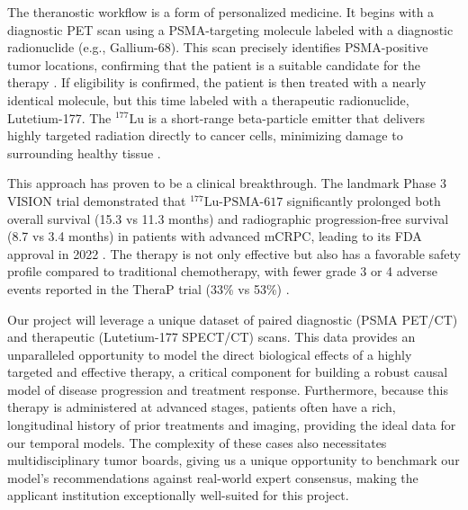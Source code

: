 \documentclass[11pt, a4paper]{article}
\begin{document}
The theranostic workflow is a form of personalized medicine. It begins with a diagnostic PET scan using a PSMA-targeting molecule labeled with a diagnostic radionuclide (e.g., Gallium-68). This scan precisely identifies PSMA-positive tumor locations, confirming that the patient is a suitable candidate for the therapy \cite{HennrichEder2022, KaewputVinjamuri2022}. If eligibility is confirmed, the patient is then treated with a nearly identical molecule, but this time labeled with a therapeutic radionuclide, Lutetium-177. The ${}^{177}\text{Lu}$ is a short-range beta-particle emitter that delivers highly targeted radiation directly to cancer cells, minimizing damage to surrounding healthy tissue \cite{HennrichEder2022, SadaghianiSheikhbahaei2022}.

This approach has proven to be a clinical breakthrough. The landmark Phase 3 VISION trial demonstrated that ${}^{177}\text{Lu-PSMA-617}$ significantly prolonged both overall survival (15.3 vs 11.3 months) and radiographic progression-free survival (8.7 vs 3.4 months) in patients with advanced mCRPC, leading to its FDA approval in 2022 \cite{TschanBorgna2022, ChandranFigg2022, RamnaraignSartor2023, JangKendi2023}. The therapy is not only effective but also has a favorable safety profile compared to traditional chemotherapy, with fewer grade 3 or 4 adverse events reported in the TheraP trial (33\% vs 53\%) \cite{HofmanEmmett2024, PatellKurian2023}.

Our project will leverage a unique dataset of paired diagnostic (PSMA PET/CT) and therapeutic (Lutetium-177 SPECT/CT) scans. This data provides an unparalleled opportunity to model the direct biological effects of a highly targeted and effective therapy, a critical component for building a robust causal model of disease progression and treatment response. Furthermore, because this therapy is administered at advanced stages, patients often have a rich, longitudinal history of prior treatments and imaging, providing the ideal data for our temporal models. The complexity of these cases also necessitates multidisciplinary tumor boards, giving us a unique opportunity to benchmark our model's recommendations against real-world expert consensus, making the applicant institution exceptionally well-suited for this project.
\end{document}
